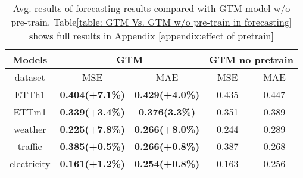 \begin{table}[]
\centering
\caption{Avg. results of forecasting results compared with GTM model w/o pre-train. Table\ref{table: GTM Vs. GTM w/o pre-train in forecasting} shows full results in Appendix \ref{appendix:effect of pretrain}}
\label{table:forecasting GTM vs. GTM w/o}
\small  %
\setlength{\tabcolsep}{2pt} %
\renewcommand{\arraystretch}{0.8} %
\begin{tabular}{c|cc|cc}
\toprule
Models &\multicolumn{2}{c|}{GTM} &\multicolumn{2}{c}{GTM no pretrain}  \\ \midrule
dataset & MSE & MAE & MSE & MAE \\\midrule
ETTh1 & \textbf{0.404(+7.1\%)} & \textbf{0.429(+4.0\%)} & 0.435 & 0.447 \\
ETTm1 & \textbf{0.339(+3.4\%)} & \textbf{0.376(3.3\%)} & 0.351 & 0.389 \\
weather & \textbf{0.225(+7.8\%)} & \textbf{0.266(+8.0\%)} & 0.244 & 0.289 \\
traffic & \textbf{0.385(+0.5\%)} & \textbf{0.266(+0.8\%)} & 0.387 & 0.268 \\
electricity & \textbf{0.161(+1.2\%)} & \textbf{0.254(+0.8\%)} & 0.163 & 0.256 \\
            \bottomrule
\end{tabular}
\end{table}